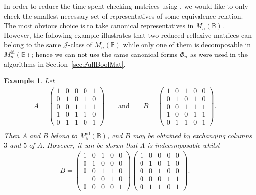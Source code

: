 \documentclass[11pt]{article}
\newtheorem{exa}[thm]{Example}
\newenvironment{ex}{\begin{exa}\rm}{\end{exa}}
\numberwithin{equation}{section}
\newcommand{\B}{\mathbb{B}}
\newcommand{\Bn}{M_n(\B)}
\newcommand{\Refln}{M_n^{\text{id}}(\B)}
\newcommand{\Refl}[1]{M_{#1}^{\text{id}}(\B)}
\newcommand{\J}{\mathscr{J}}
\begin{document}
In order to reduce the time spent checking matrices using
, we would like to only check the smallest
necessary set of representatives of some equivalence relation. The most obvious
choice is to take canonical representatives in $\Bn$. However, the following
example illustrates that two reduced reflexive matrices can belong to the same
$\J$-class of $\Bn$ while only one of them is decomposable in $\Refln$; hence we
can not use the same canonical forms $\Phi_n$ as were used in the algorithms in
Section~\ref{sec:FullBoolMat}.
\begin{ex}
  Let
\begin{align*}
  A = \begin{pmatrix}
    1 & 0 & 0 & 0 & 1 \\
    0 & 1 & 0 & 1 & 0 \\
    0 & 0 & 1 & 1 & 1 \\
    1 & 0 & 1 & 1 & 0 \\
    0 & 1 & 1 & 0 & 1 
  \end{pmatrix}\qquad\text{and}\qquad
  B = \begin{pmatrix}
    1 & 0 & 1 & 0 & 0 \\
    0 & 1 & 0 & 1 & 0 \\
    0 & 0 & 1 & 1 & 1 \\
    1 & 0 & 0 & 1 & 1 \\
    0 & 1 & 1 & 0 & 1 
  \end{pmatrix}.&\\
\end{align*}
Then $A$ and $B$ belong to $\Refl{5}$, and $B$ may be obtained by
exchanging columns $3$ and $5$ of $A$. However, it can be shown that $A$ is
indecomposable whilst
\begin{align*}
  B = \begin{pmatrix}
    1 & 0 & 1 & 0 & 0 \\
    0 & 1 & 0 & 0 & 0 \\
    0 & 0 & 1 & 1 & 0 \\
    1 & 0 & 0 & 1 & 0 \\
    0 & 0 & 0 & 0 & 1 
  \end{pmatrix}
  \begin{pmatrix}
    1 & 0 & 0 & 0 & 0 \\
    0 & 1 & 0 & 1 & 0 \\
    0 & 0 & 1 & 0 & 0 \\
    0 & 0 & 0 & 1 & 1 \\
    0 & 1 & 1 & 0 & 1 
  \end{pmatrix}.&\\
\end{align*}
\end{ex} 
\end{document}
